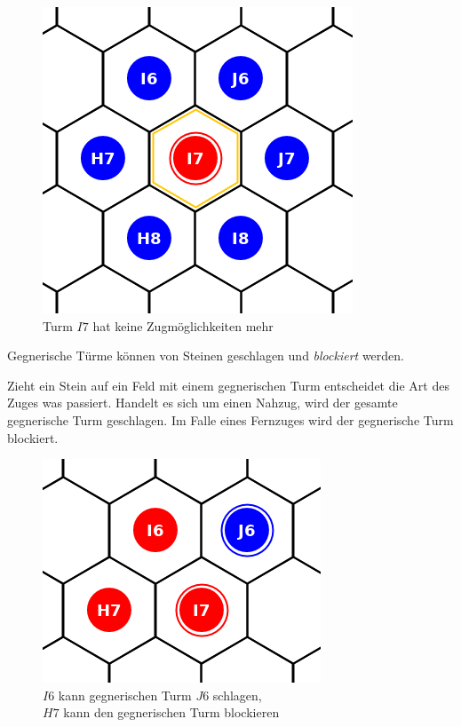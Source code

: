 \begin{figure}[ht]
\begin{center}
\includegraphics[scale=0.25]{graphic/neighbor-blocked-tower.png} \\
\smallskip
{\footnotesize Turm $I7$ hat keine Zugmöglichkeiten mehr}
\end{center}
\end{figure}

\newpage 
Gegnerische Türme können von Steinen geschlagen und \emph{blockiert} werden. 

Zieht ein Stein auf ein Feld mit einem gegnerischen Turm entscheidet die Art des Zuges was passiert. Handelt es sich um einen Nahzug, wird der gesamte gegnerische Turm geschlagen. Im Falle eines Fernzuges wird der gegnerische Turm blockiert.

\begin{figure}[ht]
\begin{center}
\includegraphics[scale=0.25]{graphic/token-kick-block-tower.png} \\
\smallskip
{\footnotesize $I6$ kann gegnerischen Turm $J6$ schlagen, \\$H7$ kann den gegnerischen Turm blockieren}
\end{center}
\end{figure}

